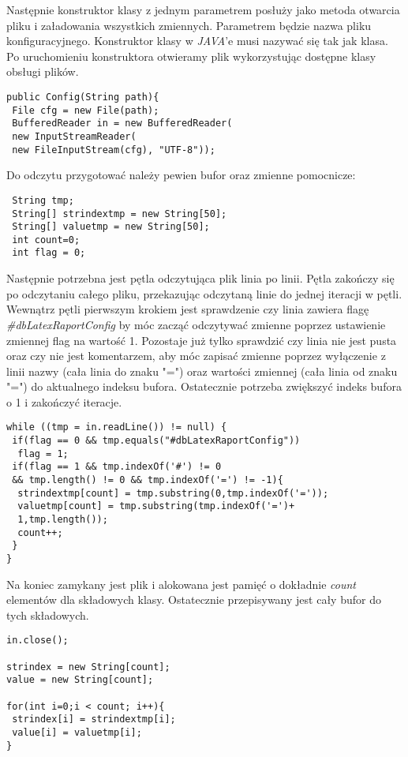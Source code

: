Następnie konstruktor klasy z jednym parametrem posłuży jako metoda otwarcia pliku i załadowania wszystkich zmiennych. Parametrem będzie nazwa pliku konfiguracyjnego. Konstruktor klasy w \emph{JAVA}'e musi nazywać się tak jak klasa. Po uruchomieniu konstruktora otwieramy plik wykorzystując dostępne klasy obsługi plików.
\begin{lstlisting}
public Config(String path){
 File cfg = new File(path);
 BufferedReader in = new BufferedReader(
 new InputStreamReader(
 new FileInputStream(cfg), "UTF-8"));
\end{lstlisting}
Do odczytu przygotować należy pewien bufor oraz zmienne pomocnicze:
\begin{lstlisting}
 String tmp;
 String[] strindextmp = new String[50];
 String[] valuetmp = new String[50];
 int count=0;
 int flag = 0;
\end{lstlisting}

Następnie potrzebna jest pętla odczytująca plik linia po linii. Pętla zakończy się po odczytaniu całego pliku, przekazując odczytaną linie do jednej iteracji w pętli. Wewnątrz pętli pierwszym krokiem jest sprawdzenie czy linia zawiera flagę \emph{\#dbLatexRaportConfig} by móc zacząć odczytywać zmienne poprzez ustawienie zmiennej flag na wartość 1. Pozostaje już tylko sprawdzić czy linia nie jest pusta oraz czy nie jest komentarzem, aby móc zapisać zmienne poprzez wyłączenie z linii nazwy (cała linia do znaku "=") oraz wartości zmiennej (cała linia od znaku "=") do aktualnego indeksu bufora. Ostatecznie potrzeba zwiększyć indeks bufora o 1 i zakończyć iteracje.
\begin{lstlisting}
while ((tmp = in.readLine()) != null) {
 if(flag == 0 && tmp.equals("#dbLatexRaportConfig"))
  flag = 1;
 if(flag == 1 && tmp.indexOf('#') != 0
 && tmp.length() != 0 && tmp.indexOf('=') != -1){
  strindextmp[count] = tmp.substring(0,tmp.indexOf('='));
  valuetmp[count] = tmp.substring(tmp.indexOf('=')+
  1,tmp.length());
  count++;
 }
}
\end{lstlisting}

Na koniec zamykany jest plik i alokowana jest pamięć o dokładnie \emph{count} elementów dla składowych klasy. Ostatecznie przepisywany jest cały bufor do tych składowych.
\begin{lstlisting}
in.close();
        
strindex = new String[count];
value = new String[count];
                  
for(int i=0;i < count; i++){
 strindex[i] = strindextmp[i];
 value[i] = valuetmp[i];
}
\end{lstlisting}

